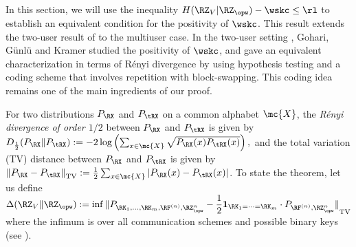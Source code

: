 In this section, we will use the inequality $H(\RZ_V|\RZ_{\opw}) - \wskc \leq \rl$ to establish an equivalent condition for the positivity of $\wskc$. This result extends the two-user result of \cite[Theorem~4]{amin2020} to the multiuser case. In the two-user setting \cite{amin2020}, Gohari, G\"{u}nl\"{u} and Kramer studied the positivity of $\wskc$, and gave an equivalent characterization in terms of R\'enyi divergence by using hypothesis testing and a coding scheme that involves repetition with block-swapping. This coding idea remains one of the main ingredients of our proof.

For two distributions $P_{\RX}$ and $P_{\tRX}$ on a common alphabet $\mc{X}$, the \emph{R\'enyi divergence of order $1/2$} between $P_{\RX}$ and $P_{\tRX}$ is given by $D_{\frac{1}{2}}(P_{\RX} \| P_{\tRX}):=-2\log\left( \sum_{x \in \mc{X}} \sqrt{P_{\RX}(x)P_{\tRX}(x)}\right),$
and the total variation (TV) distance between  $P_{\RX}$ and $P_{\tRX}$ is given by ${\|P_{\RX}-P_{\tRX}\|}_{\mathrm{TV}}:=\frac{1}{2}\sum_{x \in \mc{X}}|P_{\RX}(x)-P_{\tRX}(x)|$.
To state the theorem, let us define $\Delta(\RZ_V \| \RZ_{\opw}) := \inf {\|P_{\RK_1,\ldots, \RK_m,\RF^{(n)},\RZ^n_{\opw}}-\dfrac{1}{2}\mathbf{1}_{\RK_1=\dots=\RK_m}\cdot P_{\RF^{(n)},\RZ^n_{\opw}}\|}_{\mathrm{TV}}$ where the infimum is over all communication schemes and possible binary keys (see \cite[Def.~8]{amin2020}). 

